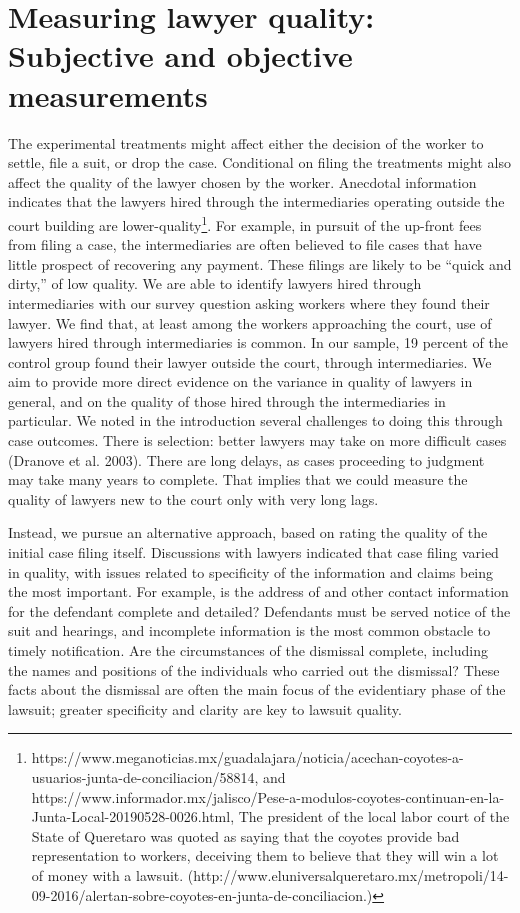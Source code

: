 \documentclass[12 pt]{article}
\begin{document}
\section{Measuring lawyer quality: Subjective and objective measurements}
\label{sec:measuring}
The experimental treatments might affect either the decision of the worker to settle, file a suit, or drop the case. Conditional on filing the treatments might also affect the quality of the lawyer chosen by the worker. Anecdotal information indicates that the lawyers hired through the intermediaries operating outside the court building are lower-quality\footnote{https://www.meganoticias.mx/guadalajara/noticia/acechan-coyotes-a-usuarios-junta-de-conciliacion/58814, and https://www.informador.mx/jalisco/Pese-a-modulos-coyotes-continuan-en-la-Junta-Local-20190528-0026.html, The president of the local labor court of the State of Queretaro was quoted as saying that the coyotes provide bad representation to workers, deceiving them to believe that they will win a lot of money with a lawsuit. (http://www.eluniversalqueretaro.mx/metropoli/14-09-2016/alertan-sobre-coyotes-en-junta-de-conciliacion.)}.  For example, in pursuit of the up-front fees from filing a case, the intermediaries are often believed to file cases that have little prospect of recovering any payment. These filings are likely to be “quick and dirty,” of low quality. We are able to identify lawyers hired through intermediaries with our survey question asking workers where they found their lawyer. We find that, at least among the workers approaching the court, use of lawyers hired through intermediaries is common. In our sample, 19 percent of the control group found their lawyer outside the court, through intermediaries. We aim to provide more direct evidence on the variance in quality of lawyers in general, and on the quality of those hired through the intermediaries in particular. We noted in the introduction several challenges to doing this through case outcomes. There is selection: better lawyers may take on more difficult cases (Dranove et al. 2003). There are long delays, as cases proceeding to judgment may take many years to complete. That implies that we could measure the quality of lawyers new to the court only with very long lags. 

Instead, we pursue an alternative approach, based on rating the quality of the initial case filing itself. Discussions with lawyers indicated that case filing varied in quality, with issues related to specificity of the information and claims being the most important. For example, is the address of and other contact information for the defendant complete and detailed? Defendants must be served notice of the suit and hearings, and incomplete information is the most common obstacle to timely notification. Are the circumstances of the dismissal complete, including the names and positions of the individuals who carried out the dismissal? These facts about the dismissal are often the main focus of the evidentiary phase of the lawsuit; greater specificity and clarity are key to lawsuit quality. 
\end{document}
